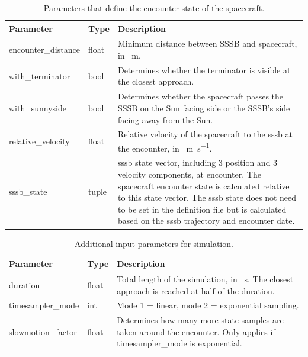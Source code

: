 \begin{table}[htpb]
    \centering
    \caption{Parameters that define the encounter state of the spacecraft.}
    \label{tab:sc_enc_paras}
    \begin{tabular}{p{}|p{}|p{}}
        \textbf{Parameter}  & \textbf{Type} & \textbf{Description} \\ \hline
        encounter\_distance & float         & Minimum distance between SSSB and spacecraft, in \SI{}{\meter}. \\
        with\_terminator    & bool          & Determines whether the terminator is visible at the closest approach. \\
        with\_sunnyside     & bool          & Determines whether the spacecraft passes the SSSB on the Sun facing side or the SSSB's side facing away from the Sun. \\
        relative\_velocity  & float         & Relative velocity of the spacecraft to the \gls{sssb} at the encounter, in \SI{}{\meter\per\second}. \\
        sssb\_state         & tuple         & \gls{sssb} state vector, including 3 position and 3 velocity components, at encounter. The spacecraft encounter state is calculated relative to this state vector. The \gls{sssb} state does not need to be set in the  definition file but is calculated based on the \gls{sssb} trajectory and encounter date.
    \end{tabular}
\end{table}

\begin{table}[htpb]
    \centering
    \caption{Additional input parameters for simulation.}
    \label{tab:sim_input_params}
    \begin{tabular}{p{}|p{}|p{}}
        \textbf{Parameter}  & \textbf{Type} & \textbf{Description} \\ \hline
        duration            & float         & Total length of the simulation, in \SI{}{\second}. The closest approach is reached at half of the duration. \\
        timesampler\_mode   & int           & Mode 1 = linear, mode 2 = exponential sampling.  \\
        slowmotion\_factor  & float         & Determines how many more state samples are taken around the encounter. Only applies if timesampler\_mode is exponential. \\
    \end{tabular}
\end{table}

